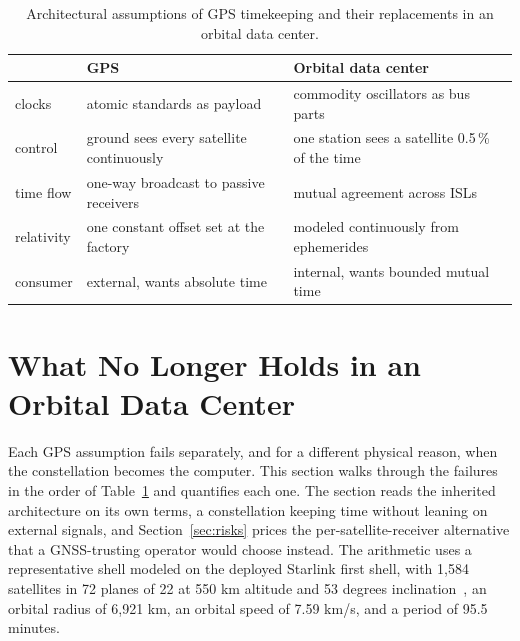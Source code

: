 \documentclass[twocolumn,10pt]{article}
\begin{document}
\begin{table}[t]
\centering
\small
\begin{tabular}{@{}p{1.55cm}p{2.85cm}p{2.9cm}@{}}
\toprule
 & \textbf{GPS} & \textbf{Orbital data center} \\
\midrule
clocks & atomic standards as payload & commodity oscillators as bus parts \\
control & ground sees every satellite continuously & one station sees a satellite 0.5\,\% of the time \\
time flow & one-way broadcast to passive receivers & mutual agreement across ISLs \\
relativity & one constant offset set at the factory & modeled continuously from ephemerides \\
consumer & external, wants absolute time & internal, wants bounded mutual time \\
\bottomrule
\end{tabular}
\caption{Architectural assumptions of GPS timekeeping and their replacements in an orbital data center.}
\label{tab:assumptions}
\end{table}

\section{What No Longer Holds in an Orbital Data Center}\label{sec:breaks}
Each GPS assumption fails separately, and for a different physical reason, when the constellation becomes the computer. This section walks through the failures in the order of Table~\ref{tab:assumptions} and quantifies each one. The section reads the inherited architecture on its own terms, a constellation keeping time without leaning on external signals, and Section~\ref{sec:risks} prices the per-satellite-receiver alternative that a GNSS-trusting operator would choose instead. The arithmetic uses a representative shell modeled on the deployed Starlink first shell, with 1{,}584 satellites in 72 planes of 22 at 550 km altitude and 53 degrees inclination~\cite{kassing2020}, an orbital radius of 6{,}921 km, an orbital speed of 7.59 km/s, and a period of 95.5 minutes.
\end{document}
